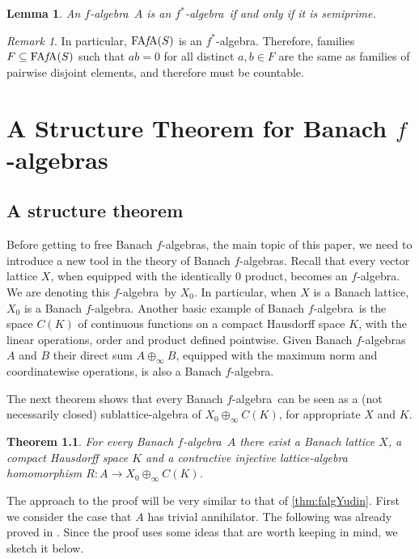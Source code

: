 \documentclass{memo-l}
\newtheorem{thm}[theorem]{Theorem}
\newtheorem{lem}[theorem]{Lemma}
\theoremstyle{definition}
\theoremstyle{remark}
\newtheorem{rem}[theorem]{Remark}
\numberwithin{section}{chapter}
\numberwithin{equation}{chapter}
\newcommand{\falg}{$f\!$-algebra}
\newcommand{\fstar}{$f^{*}\!$-algebra}
\newcommand{\FAFA}[1]{\operatorname{FA{\it f}\!A}(#1)}
\begin{document}
\begin{lem}
    An \falg\ $A$ is an \fstar\ if and only if it is semiprime.
\end{lem}

\begin{rem}
    In particular, $\FAFA S$ is an \fstar. Therefore,
    families $F\subseteq \FAFA S$ such that $ab=0$ for all distinct $a,b \in F$ are the same as families of pairwise disjoint elements,
    and therefore must be countable.
\end{rem}

\chapter{A Structure Theorem for Banach \texorpdfstring{$f$-algebras}{f-algebras}}
\label{sec:structure}

\section{A structure theorem}

Before getting to free Banach \falg s, the main topic of this paper,
we need to introduce a new tool in the theory of Banach \falg s.
Recall that every vector lattice $X$, when equipped with the
identically $0$ product, becomes an \falg. We are denoting this \falg\
by $X_0$. In particular, when $X$ is a Banach lattice, $X_0$ is a
Banach \falg. Another basic example of Banach \falg\ is the space
$C(K)$ of continuous functions on a compact Hausdorff space $K$, with
the linear operations, order and product defined pointwise. Given
Banach \falg s $A$ and $B$ their direct sum $A\oplus_\infty B$,
equipped with the maximum norm and coordinatewise operations, is also a
Banach \falg.

The next theorem shows that every Banach \falg\ can be seen as a (not
necessarily closed) sublattice-algebra of
$X_0\oplus_\infty C(K)$, for appropriate $X$ and $K$.

\begin{thm}\label{thm:structure}
    For every Banach \falg\ $A$ there exist a Banach lattice $X$,
    a compact Hausdorff space $K$ and a contractive injective lattice-algebra
    homomorphism $R\colon A\to X_0\oplus_\infty C(K)$.
\end{thm}

The approach to the proof will be very similar to that of
\cref{thm:falgYudin}. First we consider the case that $A$ has trivial
annihilator. The following was already proved in \cite[Proposition
1.7]{martignon1980}. Since the proof uses some ideas that are worth
keeping in mind, we sketch it below.
\end{document}
